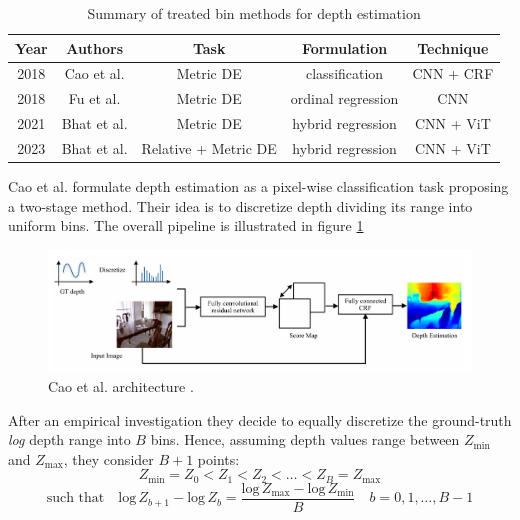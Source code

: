 \begin{center}
\begin{table}
\begin{tabular}{| c | c | c | c | c |}
\hline
\textbf{Year} & \textbf{Authors} & \textbf{Task} & \textbf{Formulation} & \textbf{Technique} \\
\hline
2018 &  Cao et al. \cite{depth_as_classification} & Metric DE & classification & CNN + CRF \\
2018 & Fu et al. \cite{ordinal_regression} & Metric DE & ordinal regression & CNN \\
2021 & Bhat et al. \cite{AdaBins} & Metric DE & hybrid regression & CNN + ViT\\
2023 & Bhat et al. \cite{ZoeDepth} & Relative + Metric DE & hybrid regression & CNN + ViT\\
\hline
\end{tabular}
\caption{Summary of treated bin methods for depth estimation}
\label{table:2}
\end{table}
\end{center}

\newpage
Cao et al. \cite{depth_as_classification} formulate depth estimation as a pixel-wise classification task proposing a two-stage method.
Their idea is to discretize depth dividing its range into uniform bins.
The overall pipeline is illustrated in figure \ref{fig:depth_as_classification}

\begin{figure}
	\centering
	\includegraphics[scale=0.35]{figs/depth_classification}
	\caption{Cao et al. architecture \cite{depth_as_classification}. \label{fig:depth_as_classification}}
\end{figure}

After an empirical investigation they decide to equally discretize the ground-truth \textit{log} depth range into $B$ bins.
Hence, assuming depth values range between $Z_{\text{min}}$ and $Z_{\text{max}}$, they consider $B+1$ points:
\[
	Z_{\text{min}}=Z_{0} < Z_{1} < Z_{2} < \dotsc < Z_{B} = Z_{\text{max}}
\]\[
	\text{such that} \quad \text{log} \, Z_{b+1} - \text{log} \, Z_{b} =
	\frac{\text{log} \, Z_{\text{max}} - \text{log} \, Z_{\text{min}}}{B}
	\quad b = 0, 1, \dotsc, B-1
\]

